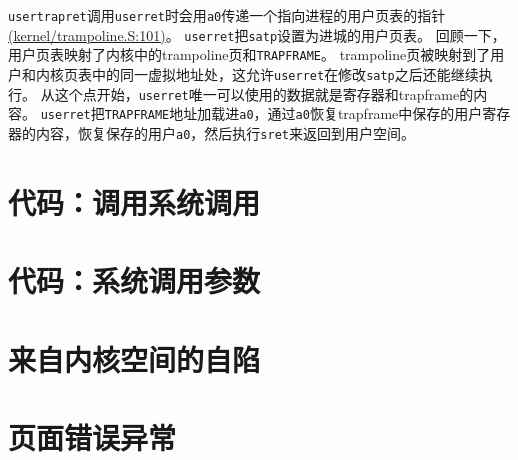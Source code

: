 \texttt{usertrapret}调用\texttt{userret}时会用\texttt{a0}传递一个指向进程的用户页表的指针\href{https://github.com/mit-pdos/xv6-riscv/blob/riscv//kernel/trampoline.S#L101}{(kernel/trampoline.S:101)}。
\texttt{userret}把\texttt{satp}设置为进城的用户页表。
回顾一下，用户页表映射了内核中的trampoline页和\texttt{TRAPFRAME}。
trampoline页被映射到了用户和内核页表中的同一虚拟地址处，这允许\texttt{userret}在修改\texttt{satp}之后还能继续执行。
从这个点开始，\texttt{userret}唯一可以使用的数据就是寄存器和trapframe的内容。
\texttt{userret}把\texttt{TRAPFRAME}地址加载进\texttt{a0}，通过\texttt{a0}恢复trapframe中保存的用户寄存器的内容，恢复保存的用户\texttt{a0}，然后执行\texttt{sret}来返回到用户空间。

\section{代码：调用系统调用}

\section{代码：系统调用参数}

\section{来自内核空间的自陷}\label{s4-5}

\section{页面错误异常}\label{s4-6}
